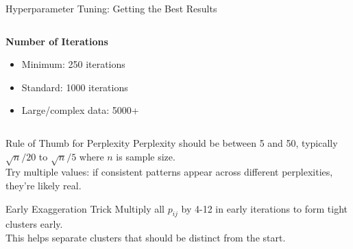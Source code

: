 \documentclass[10pt]{beamer}
\begin{document}
\begin{frame}{Hyperparameter Tuning: Getting the Best Results}
\begin{columns}
\begin{column}{0.5\textwidth}
\vspace{0.15cm}
\textbf{Number of Iterations}
\begin{itemize}
    \setlength\itemsep{0em}
    \item Minimum: 250 iterations
    \item Standard: 1000 iterations
    \item Large/complex data: 5000+
\end{itemize}
\end{column}
\end{columns}

\vspace{0.2cm}
\begin{alertblock}{Rule of Thumb for Perplexity}
\footnotesize
Perplexity should be between 5 and 50, typically $\sqrt{n}/20$ to $\sqrt{n}/5$ where $n$ is sample size.\\
Try multiple values: if consistent patterns appear across different perplexities, they're likely real.
\end{alertblock}

\vspace{0.15cm}
\begin{exampleblock}{Early Exaggeration Trick}
\footnotesize
Multiply all $p_{ij}$ by 4-12 in early iterations to form tight clusters early.\\
This helps separate clusters that should be distinct from the start.
\end{exampleblock}

\end{frame}
\end{document}
